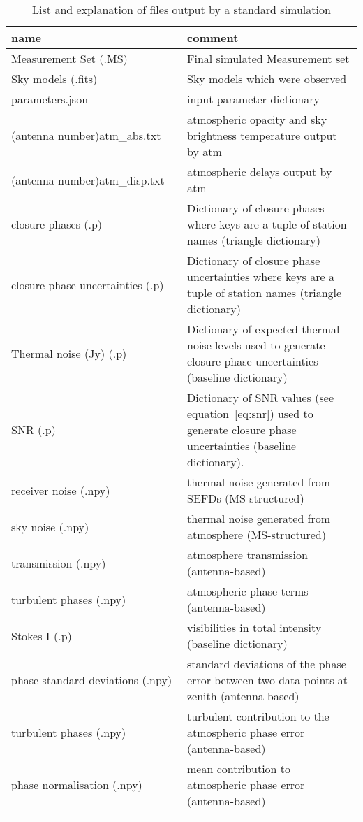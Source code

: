 \begin{longtable}{p{0.5\linewidth}|p{0.6\linewidth}}
name&comment\\
\hline
Measurement Set (.MS) & Final simulated Measurement set \\
Sky models (.fits)& Sky models which were observed\\
parameters.json &input parameter dictionary\\
(antenna number)atm\_abs.txt&atmospheric opacity and sky brightness temperature output by {\sc atm}\\
(antenna number)atm\_disp.txt&atmospheric delays output by {\sc atm}\\
closure phases (.p) & Dictionary of closure phases where keys are a tuple of station names (triangle dictionary)\\
closure phase uncertainties (.p) & Dictionary of closure phase uncertainties where keys are a tuple of station names (triangle dictionary)\\
Thermal noise (Jy) (.p)  & Dictionary of expected thermal noise levels used to generate closure phase uncertainties (baseline dictionary)\\
SNR (.p)  & Dictionary of SNR values (see equation~\ref{eq:snr}) used to generate closure phase uncertainties (baseline dictionary). \\
receiver noise (.npy) & thermal noise generated from SEFDs (MS-structured)\\
sky noise (.npy) & thermal noise generated from atmosphere (MS-structured)\\
transmission (.npy) & atmosphere transmission (antenna-based)\\
turbulent phases (.npy) & atmospheric phase terms (antenna-based)\\
Stokes I (.p)& visibilities in total intensity (baseline dictionary)\\
phase standard deviations (.npy)& standard deviations of the phase error between two data points at zenith (antenna-based)\\
turbulent phases (.npy) & turbulent contribution to the atmospheric phase error (antenna-based)\\
phase normalisation (.npy) & mean contribution to atmospheric phase error (antenna-based)\\

\caption[List and explanation of files output by a standard simulation]{List and explanation of files output by a standard simulation}
\label{tab:outputs}
\end{longtable}

